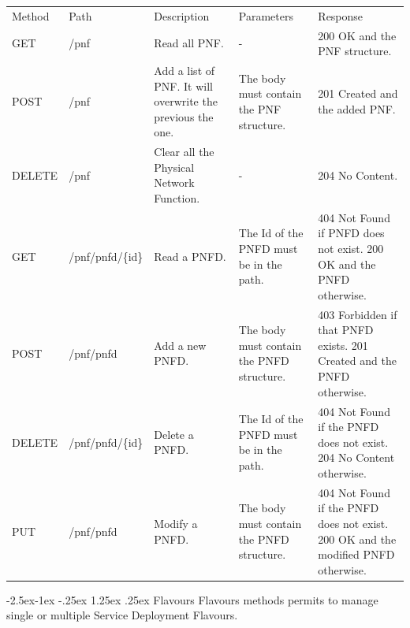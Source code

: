 \documentclass[11pt, english]{article}
\makeatletter
\renewcommand\paragraph{\@startsection{paragraph}{4}{\z@}%
            {-2.5ex\@plus -1ex \@minus -.25ex}%
            {1.25ex \@plus .25ex}%
            {\normalfont\normalsize\bfseries}}
\makeatother
\begin{document}
\begin{tabular}{ |p{2cm}|m{3cm}|p{3cm}|p{3cm}|p{4cm}| }
    \hline
    \rowcolor{black} \multicolumn{5}{|c|}{\textcolor{white}{PNF}} \\
    \hline
    \rowcolor{Gray}
    Method & Path & Description & Parameters & Response \\
    \hline
    GET   & /pnf & Read all PNF. & - & 200 OK and the PNF structure. \\
    \hline
    POST & /pnf & Add a list of PNF. It will overwrite the previous the one. & The body must contain the PNF structure. & 201 Created and the added PNF. \\
    \hline
    DELETE & /pnf & Clear all the Physical Network Function. & - & 204 No Content. \\
    \hline
    GET & /pnf/pnfd/\{id\} & Read a PNFD. & The Id of the PNFD must be in the path. & 404 Not Found if PNFD does not exist. 200 OK and the PNFD otherwise. \\
    \hline
    POST & /pnf/pnfd & Add a new PNFD. & The body must contain the PNFD structure. & 403 Forbidden if that PNFD exists. 201 Created and the PNFD otherwise. \\
    \hline
    DELETE & /pnf/pnfd/\{id\} & Delete a PNFD. & The Id of the PNFD must be in the path. & 404 Not Found if the PNFD does not exist. 204 No Content otherwise. \\
    \hline
    PUT & /pnf/pnfd & Modify a PNFD. & The body must contain the PNFD structure. & 404 Not Found if the PNFD does not exist. 200 OK and the modified PNFD otherwise. \\
    \hline
\end{tabular}

\newpage
\paragraph{Flavours}
Flavours methods permits to manage single or multiple Service Deployment Flavours. \\
\end{document}
